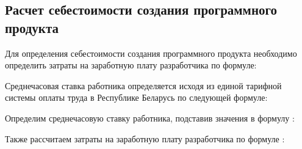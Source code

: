 \subsection{Расчет себестоимости создания программного продукта}
\label{sec:economics:pppurecost}

Для определения себестоимости создания программного продукта необходимо определить затраты на заработную плату разработчика по формуле:
\developerHourPriceEquation

Среднечасовая ставка работника определяется исходя из единой тарифной системы оплаты труда в Республике Беларусь по следующей формуле:
\developerHourRateEquation

Определим среднечасовую ставку работника, подставив значения в формулу :
\developerHourRateFormulaApplied

Также рассчитаем затраты на заработную плату разработчика по формуле :
\developerHourPriceFormulaApplied
